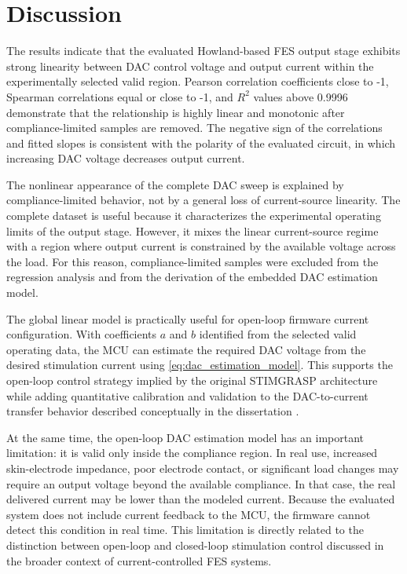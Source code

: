 \documentclass[conference]{IEEEtran}
\begin{document}
\section{Discussion}

The results indicate that the evaluated Howland-based FES output stage exhibits strong linearity between DAC control voltage and output current within the experimentally selected valid region. Pearson correlation coefficients close to -1, Spearman correlations equal or close to -1, and $R^2$ values above 0.9996 demonstrate that the relationship is highly linear and monotonic after compliance-limited samples are removed. The negative sign of the correlations and fitted slopes is consistent with the polarity of the evaluated circuit, in which increasing DAC voltage decreases output current.

The nonlinear appearance of the complete DAC sweep is explained by compliance-limited behavior, not by a general loss of current-source linearity. The complete dataset is useful because it characterizes the experimental operating limits of the output stage. However, it mixes the linear current-source regime with a region where output current is constrained by the available voltage across the load. For this reason, compliance-limited samples were excluded from the regression analysis and from the derivation of the embedded DAC estimation model.

The global linear model is practically useful for open-loop firmware current configuration. With coefficients $a$ and $b$ identified from the selected valid operating data, the MCU can estimate the required DAC voltage from the desired stimulation current using \eqref{eq:dac_estimation_model}. This supports the open-loop control strategy implied by the original STIMGRASP architecture while adding quantitative calibration and validation to the DAC-to-current transfer behavior described conceptually in the dissertation \cite{STIMGRASP_THESIS}.

At the same time, the open-loop DAC estimation model has an important limitation: it is valid only inside the compliance region. In real use, increased skin-electrode impedance, poor electrode contact, or significant load changes may require an output voltage beyond the available compliance. In that case, the real delivered current may be lower than the modeled current. Because the evaluated system does not include current feedback to the MCU, the firmware cannot detect this condition in real time. This limitation is directly related to the distinction between open-loop and closed-loop stimulation control discussed in the broader context of current-controlled FES systems.
\end{document}
